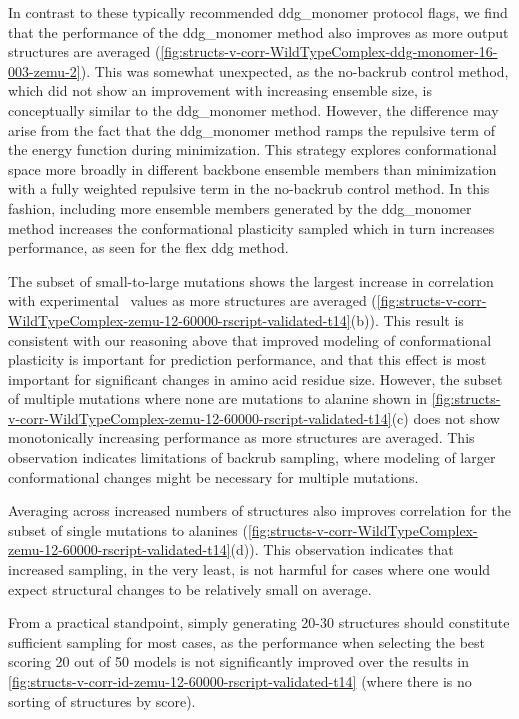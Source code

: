 In contrast to these typically recommended ddg\_monomer protocol flags\cite{kellogg_role_2011}, we find that the performance of the ddg\_monomer method also improves as more output structures are averaged (\cref{fig:structs-v-corr-WildTypeComplex-ddg-monomer-16-003-zemu-2}).
This was somewhat unexpected, as the no-backrub control method, which did not show an improvement with increasing ensemble size, is conceptually similar to the ddg\_monomer method. However, the difference may arise from the fact that the ddg\_monomer method ramps the repulsive term of the energy function during minimization. This strategy explores conformational space more broadly in different backbone ensemble members than minimization with a fully weighted repulsive term in the no-backrub control method. In this fashion, including more ensemble members generated by the ddg\_monomer method increases the conformational plasticity sampled which in turn increases performance, as seen for the flex ddg method.

The subset of small-to-large mutations shows the largest increase in correlation with experimental \ddg\ values as more structures are averaged (\cref{fig:structs-v-corr-WildTypeComplex-zemu-12-60000-rscript-validated-t14}(b)). This result is consistent with our reasoning above that improved modeling of conformational plasticity is important for prediction performance, and that this effect is most important for significant changes in amino acid residue size. However, the subset of multiple mutations where none are mutations to alanine shown in \cref{fig:structs-v-corr-WildTypeComplex-zemu-12-60000-rscript-validated-t14}(c) does not show monotonically increasing performance as more structures are averaged. This observation indicates limitations of backrub sampling, where modeling of larger conformational changes might be necessary for multiple mutations.

Averaging across increased numbers of structures also improves correlation for the subset of single mutations to alanines (\cref{fig:structs-v-corr-WildTypeComplex-zemu-12-60000-rscript-validated-t14}(d)). This observation indicates that increased sampling, in the very least, is not harmful for cases where one would expect structural changes to be relatively small on average.

From a practical standpoint, simply generating 20-30 structures should constitute sufficient sampling for most cases, as the performance when selecting the best scoring 20 out of 50 models is not significantly improved over the results in \cref{fig:structs-v-corr-id-zemu-12-60000-rscript-validated-t14} (where there is no sorting of structures by score).

